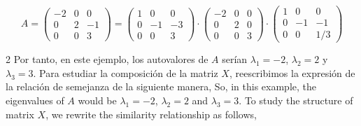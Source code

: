 \begin{equation*}
A= \begin{pmatrix}
-2& 0& 0\\
0& 2 & -1\\
0& 0& 3
\end{pmatrix}=\begin{pmatrix}
1& 0& 0\\
0& -1& -3\\
0& 0& 3
\end{pmatrix}\cdot \begin{pmatrix}
-2& 0& 0\\
0& 2& 0\\
0& 0& 3
\end{pmatrix} \cdot \begin{pmatrix}
1& 0& 0\\
0& -1& -1\\
0& 0& 1/3
\end{pmatrix}
\end{equation*}
\begin{paracol}{2}
Por tanto, en este ejemplo, los autovalores de $A$ serían $\lambda_1=-2$, $\lambda_2=2$ y $\lambda_3=3$. Para estudiar la composición de la matriz $X$, reescribimos la expresión de la relación de semejanza de la siguiente manera,
\switchcolumn
So, in this example, the eigenvalues of $A$ would be $\lambda_1=-2$, $\lambda_2=2$ and $\lambda_3=3$. To study the structure of matrix $X$, we rewrite the similarity relationship as follows,
\end{paracol}


